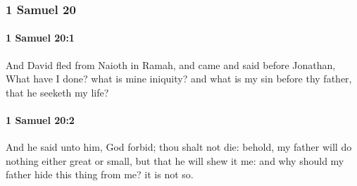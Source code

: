 	\subsubsection{1 Samuel 20} %
		\label{1SAMUEL-20}

		\paragraph{1 Samuel 20:1} %
			\label{1SAMUEL-20-1}

			And David fled from Naioth in Ramah, and came and said before Jonathan, What have I done? what is mine iniquity? and what is my sin before thy father, that he seeketh my life?


		\paragraph{1 Samuel 20:2} %
			\label{1SAMUEL-20-2}

			And he said unto him, God forbid; thou shalt not die: behold, my father will do nothing either great or small, but that he will shew it me: and why should my father hide this thing from me? it is not so.

